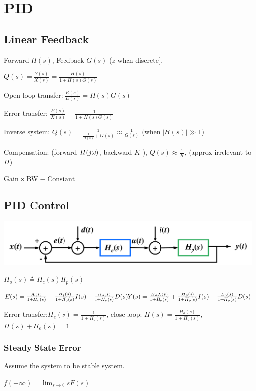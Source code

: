 \section{PID}

\subsection*{Linear Feedback}
Forward $H(s)$, Feedback $G(s)$ ($z$ when discrete).

$Q(s) = \frac{Y(s)}{X(s)} = \frac{H(s)}{1+H(s)G(s)}$

Open loop transfer: $\frac{R(s)}{E(s)} = H(s) G(s)$

Error transfer: $\frac{E(s)}{X(s)} = \frac{1}{1 + H(s) G(s)}$

Inverse system: $Q(s) = \frac{1}{\frac{1}{H(s)} + G(s)} \approx \frac{1}{G(s)}$ (when $|H(s)| \gg 1$)

Compensation: (forward $H(j\omega)$, backward $K$ ), $Q(s) \approx \frac 1 K$, (approx irrelevant to $H$)

$\text{Gain} \times \text{BW} \equiv \text{Constant}$

\subsection*{PID Control}

\includegraphics[scale=0.25]{inhalt/pid.png}

$H_o(s) \triangleq H_c(s) H_p(s)$

$E(s) = \frac{X(s)}{1+H_o(s)} - \frac{H_p(s)}{1+H_o(s)} I(s) - \frac{H_o(s)}{1 + H_o(s)} D(s)\\ Y(s) = \frac{H_oX(s)}{1+H_o(s)} + \frac{H_p(s)}{1+H_o(s)} I(s) + \frac{H_o(s)}{1 + H_o(s)} D(s)$

Error transfer:$H_e(s) = \frac{1}{1+H_o(s)}$, close loop: $H(s) = \frac{H_o(s)}{1 + H_o(s)}$, $H(s)+H_e(s) = 1$


\subsubsection*{Steady State Error}
Assume the system to be stable system.

$f(+\infty) = \lim_{s\to 0} sF(s)$

